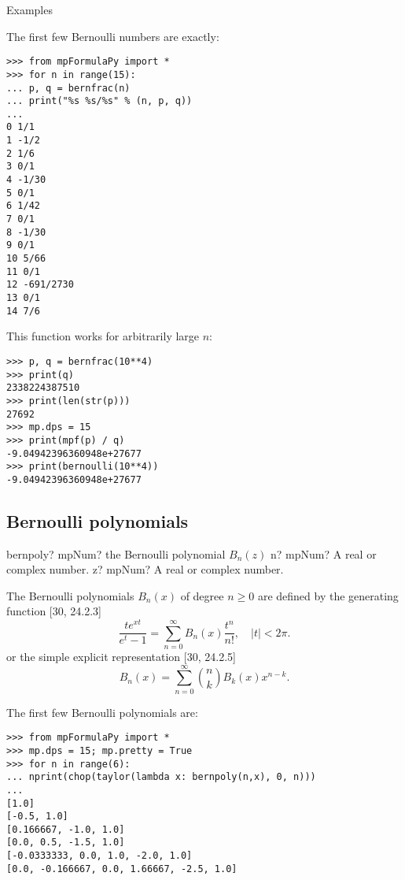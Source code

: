 \vpara
Examples

The first few Bernoulli numbers are exactly:

\begin{lstlisting}
>>> from mpFormulaPy import *
>>> for n in range(15):
... p, q = bernfrac(n)
... print("%s %s/%s" % (n, p, q))
...
0 1/1
1 -1/2
2 1/6
3 0/1
4 -1/30
5 0/1
6 1/42
7 0/1
8 -1/30
9 0/1
10 5/66
11 0/1
12 -691/2730
13 0/1
14 7/6
\end{lstlisting}

This function works for arbitrarily large $n$:

\begin{lstlisting}
>>> p, q = bernfrac(10**4)
>>> print(q)
2338224387510
>>> print(len(str(p)))
27692
>>> mp.dps = 15
>>> print(mpf(p) / q)
-9.04942396360948e+27677
>>> print(bernoulli(10**4))
-9.04942396360948e+27677
\end{lstlisting}





\subsection{Bernoulli polynomials}

\begin{mpFunctionsExtract}
	\mpFunctionTwo
	{bernpoly? mpNum? the Bernoulli polynomial $B_n(z)$}
	{n? mpNum? A real or complex number.}
	{z? mpNum? A real or complex number.}		
\end{mpFunctionsExtract}


\vspace{0.3cm}
The Bernoulli polynomials $B_n (x)$ of degree $n \geq 0$ are defined by the generating function [30, 24.2.3]
\begin{equation}
\frac{te^{xt}}{e^t - 1} = \sum_{n=0}^{\infty} B_n(x) \frac{t^n}{n!}, \quad |t| < 2\pi.
\end{equation}
or the simple explicit representation [30, 24.2.5]
\begin{equation}
B_n(x) = \sum_{n=0}^{\infty} \binom{n}{k} B_k(x) x^{n-k}.
\end{equation}

\vpara
The first few Bernoulli polynomials are:

\begin{lstlisting}
>>> from mpFormulaPy import *
>>> mp.dps = 15; mp.pretty = True
>>> for n in range(6):
... nprint(chop(taylor(lambda x: bernpoly(n,x), 0, n)))
...
[1.0]
[-0.5, 1.0]
[0.166667, -1.0, 1.0]
[0.0, 0.5, -1.5, 1.0]
[-0.0333333, 0.0, 1.0, -2.0, 1.0]
[0.0, -0.166667, 0.0, 1.66667, -2.5, 1.0]
\end{lstlisting}

